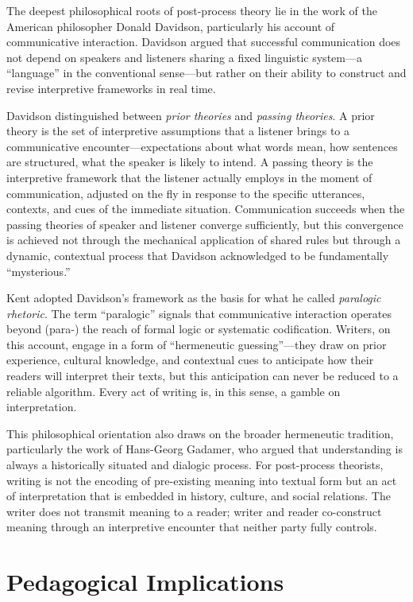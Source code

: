 \documentclass[12pt]{article}
\begin{document}
The deepest philosophical roots of post-process theory lie in the work of the American philosopher Donald Davidson, particularly his account of communicative interaction. Davidson argued that successful communication does not depend on speakers and listeners sharing a fixed linguistic system---a ``language'' in the conventional sense---but rather on their ability to construct and revise interpretive frameworks in real time.

Davidson distinguished between \textit{prior theories} and \textit{passing theories}. A prior theory is the set of interpretive assumptions that a listener brings to a communicative encounter---expectations about what words mean, how sentences are structured, what the speaker is likely to intend. A passing theory is the interpretive framework that the listener actually employs in the moment of communication, adjusted on the fly in response to the specific utterances, contexts, and cues of the immediate situation. Communication succeeds when the passing theories of speaker and listener converge sufficiently, but this convergence is achieved not through the mechanical application of shared rules but through a dynamic, contextual process that Davidson acknowledged to be fundamentally ``mysterious.''

Kent adopted Davidson's framework as the basis for what he called \textit{paralogic rhetoric}. The term ``paralogic'' signals that communicative interaction operates beyond (para-) the reach of formal logic or systematic codification. Writers, on this account, engage in a form of ``hermeneutic guessing''---they draw on prior experience, cultural knowledge, and contextual cues to anticipate how their readers will interpret their texts, but this anticipation can never be reduced to a reliable algorithm. Every act of writing is, in this sense, a gamble on interpretation.

This philosophical orientation also draws on the broader hermeneutic tradition, particularly the work of Hans-Georg Gadamer, who argued that understanding is always a historically situated and dialogic process. For post-process theorists, writing is not the encoding of pre-existing meaning into textual form but an act of interpretation that is embedded in history, culture, and social relations. The writer does not transmit meaning to a reader; writer and reader co-construct meaning through an interpretive encounter that neither party fully controls.

\section{Pedagogical Implications}
\end{document}

